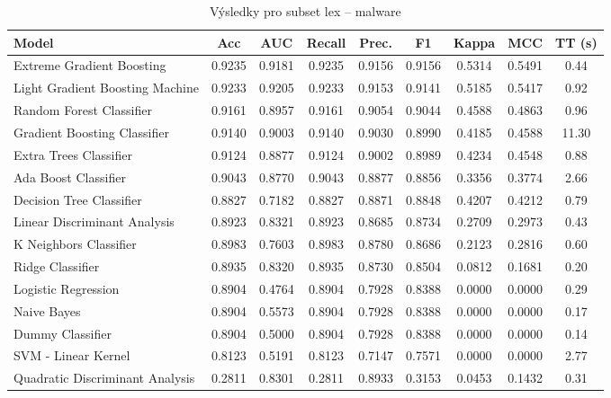 \begin{table}[H]
  \centering
  \small
  \caption{Výsledky pro subset lex – malware}
  \begin{tabular}{|l|c|c|c|c|c|c|c|c|}
    \hline
    \textbf{Model} & \textbf{Acc} & \textbf{AUC} & \textbf{Recall} & \textbf{Prec.} & \textbf{F1} & \textbf{Kappa} & \textbf{MCC} & \textbf{TT (s)} \\
    \hline
    Extreme Gradient Boosting & 0.9235 & 0.9181 & 0.9235 & 0.9156 & 0.9156 & 0.5314 & 0.5491 & 0.44 \\
    Light Gradient Boosting Machine & 0.9233 & 0.9205 & 0.9233 & 0.9153 & 0.9141 & 0.5185 & 0.5417 & 0.92 \\
    Random Forest Classifier & 0.9161 & 0.8957 & 0.9161 & 0.9054 & 0.9044 & 0.4588 & 0.4863 & 0.96 \\
    Gradient Boosting Classifier & 0.9140 & 0.9003 & 0.9140 & 0.9030 & 0.8990 & 0.4185 & 0.4588 & 11.30 \\
    Extra Trees Classifier & 0.9124 & 0.8877 & 0.9124 & 0.9002 & 0.8989 & 0.4234 & 0.4548 & 0.88 \\
    Ada Boost Classifier & 0.9043 & 0.8770 & 0.9043 & 0.8877 & 0.8856 & 0.3356 & 0.3774 & 2.66 \\
    Decision Tree Classifier & 0.8827 & 0.7182 & 0.8827 & 0.8871 & 0.8848 & 0.4207 & 0.4212 & 0.79 \\
    Linear Discriminant Analysis & 0.8923 & 0.8321 & 0.8923 & 0.8685 & 0.8734 & 0.2709 & 0.2973 & 0.43 \\
    K Neighbors Classifier & 0.8983 & 0.7603 & 0.8983 & 0.8780 & 0.8686 & 0.2123 & 0.2816 & 0.60 \\
    Ridge Classifier & 0.8935 & 0.8320 & 0.8935 & 0.8730 & 0.8504 & 0.0812 & 0.1681 & 0.20 \\
    Logistic Regression & 0.8904 & 0.4764 & 0.8904 & 0.7928 & 0.8388 & 0.0000 & 0.0000 & 0.29 \\
    Naive Bayes & 0.8904 & 0.5573 & 0.8904 & 0.7928 & 0.8388 & 0.0000 & 0.0000 & 0.17 \\
    Dummy Classifier & 0.8904 & 0.5000 & 0.8904 & 0.7928 & 0.8388 & 0.0000 & 0.0000 & 0.14 \\
    SVM - Linear Kernel & 0.8123 & 0.5191 & 0.8123 & 0.7147 & 0.7571 & 0.0000 & 0.0000 & 2.77 \\
    Quadratic Discriminant Analysis & 0.2811 & 0.8301 & 0.2811 & 0.8933 & 0.3153 & 0.0453 & 0.1432 & 0.31 \\
    \hline
  \end{tabular}
\end{table}
\vspace{0.5cm}

